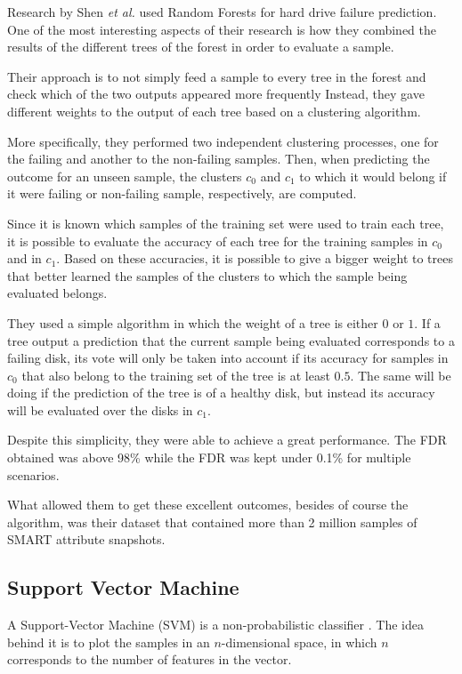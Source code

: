 Research by Shen \textit{et al.} \cite{Shen18} used Random Forests for hard drive failure prediction.
One of the most interesting aspects of their research is how they combined the results of the different trees of the forest in order to evaluate a sample.

Their approach is to not simply feed a sample to every tree in the forest and check which of the two outputs appeared more frequently
Instead, they gave different weights to the output of each tree based on a clustering algorithm.

More specifically, they performed two independent clustering processes, one for the failing and another to the non-failing samples.
Then, when predicting the outcome for an unseen sample, the clusters $c_0$ and $c_1$ to which it would belong if it were failing or non-failing sample, respectively, are computed.

Since it is known which samples of the training set were used to train each tree, it is possible to evaluate the accuracy of each tree for the training samples in $c_0$ and in $c_1$.
Based on these accuracies, it is possible to give a bigger weight to trees that better learned the samples of the clusters to which the sample being evaluated belongs.

They used a simple algorithm in which the weight of a tree is either $0$ or $1$.
If a tree output a prediction that the current sample being evaluated corresponds to a failing disk, its vote will only be taken into account if its accuracy for samples in $c_0$ that also belong to the training set of the tree is at least $0.5$.
The same will be doing if the prediction of the tree is of a healthy disk, but instead its accuracy will be evaluated over the disks in $c_1$.

Despite this simplicity, they were able to achieve a great performance.
The FDR obtained was above 98\% while the FDR was kept under 0.1\% for multiple scenarios.

What allowed them to get these excellent outcomes, besides of course the algorithm, was their dataset that contained more than 2 million samples of SMART attribute snapshots.

\subsection{Support Vector Machine}

A Support-Vector Machine (SVM) is a non-probabilistic classifier \cite{cortes1995support}.
The idea behind it is to plot the samples in an $n$-dimensional space, in which $n$ corresponds to the number of features in the vector.

